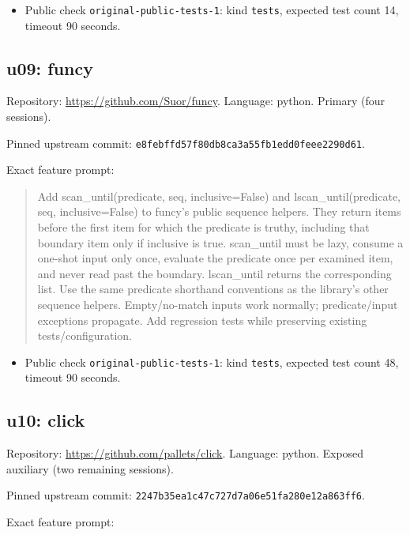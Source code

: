 \documentclass[manuscript,screen,nonacm]{acmart}
\providecommand{\tightlist}{\setlength{\itemsep}{0pt}\setlength{\parskip}{0pt}}
\begin{document}
\begin{itemize}
\tightlist
\item
  Public check \nolinkurl{original-public-tests-1}: kind \texttt{tests},
  expected test count 14, timeout 90 seconds.
\end{itemize}

\subsection{u09: funcy}\label{u09-funcy}

Repository: \url{https://github.com/Suor/funcy}. Language: python.
Primary (four sessions).

Pinned upstream commit:
\nolinkurl{e8febffd57f80db8ca3a55fb1edd0feee2290d61}.

Exact feature prompt:

\begin{quote}
Add scan\_until(predicate, seq, inclusive=False) and
lscan\_until(predicate, seq, inclusive=False) to funcy's public sequence
helpers. They return items before the first item for which the predicate
is truthy, including that boundary item only if inclusive is true.
scan\_until must be lazy, consume a one-shot input only once, evaluate
the predicate once per examined item, and never read past the boundary.
lscan\_until returns the corresponding list. Use the same predicate
shorthand conventions as the library's other sequence helpers.
Empty/no-match inputs work normally; predicate/input exceptions
propagate. Add regression tests while preserving existing
tests/configuration.
\end{quote}

\begin{itemize}
\tightlist
\item
  Public check \nolinkurl{original-public-tests-1}: kind \texttt{tests},
  expected test count 48, timeout 90 seconds.
\end{itemize}

\subsection{u10: click}\label{u10-click}

Repository: \url{https://github.com/pallets/click}. Language: python.
Exposed auxiliary (two remaining sessions).

Pinned upstream commit:
\nolinkurl{2247b35ea1c47c727d7a06e51fa280e12a863ff6}.

Exact feature prompt:
\end{document}
